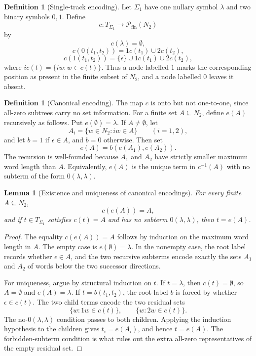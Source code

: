 \documentclass[11pt]{article}
\newtheorem{lemma}[theorem]{Lemma}
\theoremstyle{definition}
\newtheorem{definition}[theorem]{Definition}
\newcommand{\powfin}{\mathcal P_{\mathrm{fin}}}
\newcommand{\Term}[1]{T_{#1}}
\begin{document}
\begin{definition}[Single-track encoding]
Let \(\Sigma_1\) have one nullary symbol \(\lambda\) and two binary symbols
\(0,1\).  Define
\[
  c:\Term{\Sigma_1}\to \powfin(N_2)
\]
by
\[
  c(\lambda)=\emptyset,
\]
\[
  c(0(t_1,t_2))=1c(t_1)\cup 2c(t_2),
\]
\[
  c(1(t_1,t_2))=\{\epsilon\}\cup 1c(t_1)\cup 2c(t_2),
\]
where \(ic(t)=\{iw:w\in c(t)\}\).  Thus a node labelled \(1\) marks the
corresponding position as present in the finite subset of \(N_2\), and a node
labelled \(0\) leaves it absent.
\end{definition}

\begin{definition}[Canonical encoding]
The map \(c\) is onto but not one-to-one, since all-zero subtrees carry no set
information.  For a finite set \(A\subseteq N_2\), define \(e(A)\) recursively
as follows.  Put \(e(\emptyset)=\lambda\).  If \(A\ne\emptyset\), let
\[
  A_i=\{w\in N_2:iw\in A\}\qquad(i=1,2),
\]
and let \(b=1\) if \(\epsilon\in A\), and \(b=0\) otherwise.  Then set
\[
  e(A)=b(e(A_1),e(A_2)).
\]
The recursion is well-founded because \(A_1\) and \(A_2\) have strictly smaller
maximum word length than \(A\).  Equivalently, \(e(A)\) is the unique term in
\(c^{-1}(A)\) with no subterm of the form \(0(\lambda,\lambda)\).
\end{definition}

\begin{lemma}[Existence and uniqueness of canonical encodings]\label{lem:canonical-encoding-unique}
For every finite \(A\subseteq N_2\),
\[
  c(e(A))=A,
\]
and if \(t\in\Term{\Sigma_1}\) satisfies \(c(t)=A\) and has no subterm
\(0(\lambda,\lambda)\), then \(t=e(A)\).
\end{lemma}

\begin{proof}
The equality \(c(e(A))=A\) follows by induction on the maximum word length in
\(A\).  The empty case is \(e(\emptyset)=\lambda\).  In the nonempty case,
the root label records whether \(\epsilon\in A\), and the two recursive
subterms encode exactly the sets \(A_1\) and \(A_2\) of words below the two
successor directions.

For uniqueness, argue by structural induction on \(t\).  If \(t=\lambda\), then
\(c(t)=\emptyset\), so \(A=\emptyset\) and \(e(A)=\lambda\).  If
\(t=b(t_1,t_2)\), the root label \(b\) is forced by whether
\(\epsilon\in c(t)\).  The two child terms encode the two residual sets
\[
  \{w:1w\in c(t)\},\qquad \{w:2w\in c(t)\}.
\]
The no-\(0(\lambda,\lambda)\) condition passes to both children.  Applying the
induction hypothesis to the children gives \(t_i=e(A_i)\), and hence
\(t=e(A)\).  The forbidden-subterm condition is what rules out the extra
all-zero representatives of the empty residual set.
\end{proof}
\end{document}
